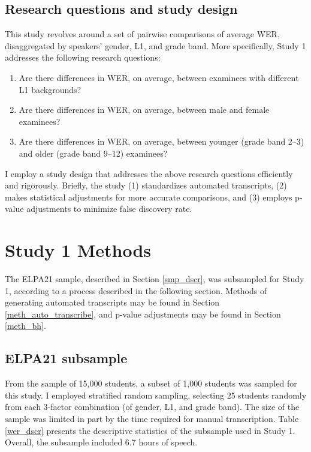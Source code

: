 \documentclass [PhD] {uclathes}
\begin{document}
\subsection{Research questions and study design}

This study revolves around a set of pairwise comparisons of average WER, disaggregated by speakers’ gender, L1, and grade band. More specifically, Study 1 addresses the following research questions:

\begin{enumerate}
	\item Are there differences in WER, on average, between examinees with different L1 backgrounds?
	\item Are there differences in WER, on average, between male and female examinees?
	\item Are there differences in WER, on average, between younger (grade band 2–3) and older (grade band 9–12) examinees?
\end{enumerate}

I employ a study design that addresses the above research questions efficiently and rigorously. Briefly, the study (1) standardizes automated transcripts, (2) makes statistical adjustments for more accurate comparisons, and (3) employs p-value adjustments to minimize false discovery rate.

\section{Study 1 Methods}

The ELPA21 sample, described in Section \ref{smp_dscr}, was subsampled for Study 1, according to a process described in the following section. Methods of generating automated transcripts may be found in Section \ref{meth_auto_transcribe}, and p-value adjustments may be found in Section \ref{meth_bh}. 

\subsection{ELPA21 subsample}

From the sample of 15,000 students, a subset of 1,000 students was sampled for this study. I employed stratified random sampling, selecting 25 students randomly from each 3-factor combination (of gender, L1, and grade band). The size of the sample was limited in part by the time required for manual transcription. Table \ref{wer_dscr} presents the descriptive statistics of the subsample used in Study 1. Overall, the subsample included 6.7 hours of speech. 
\end{document}

